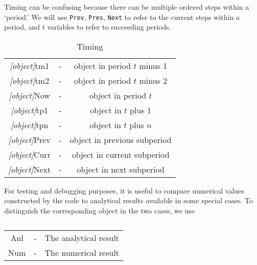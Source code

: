 Timing can be confusing because there can be multiple ordered steps
within a `period.'  We will use \texttt{Prev}, \texttt{Pres}, \texttt{Next} to refer
to the current steps within a period, and $t$ variables to refer to succeeding periods.
\begin{table}[h]
	\centering
	\begin{tabular}{||>{\ttfamily}ccc||}
		\hline
   \textit{[object]}tm1 & - & object in period $t$ minus 1
\\ \textit{[object]}tm2 & - & object in period $t$ minus 2
\\ \textit{[object]}Now & - & object in period $t$
\\ \textit{[object]}tp1 & - & object in $t$ plus 1
\\ \textit{[object]}tpn & - & object in $t$ plus $n$
\\ \textit{[object]}Prev & - & object in previous subperiod
\\ \textit{[object]}Curr & - & object in current subperiod
\\ \textit{[object]}Next & - & object in next subperiod
\\	\hline
	\end{tabular}

	\caption{Timing}
	\label{table:Timing}
\end{table}

For testing and debugging purposes, it is useful to compare numerical
values constructed by the code to analytical results available in some
special cases.  To distinguish the corresponding object in the two cases,
we use
\begin{table}[h]
	\centering
	\begin{tabular}{||>{\ttfamily}ccc||}
		\hline
Anl & - & The analytical result
\\ Num & - & The numerical result
\\ \hline
	\end{tabular}
	\caption{}
	\label{table:AnlVsNum}
\end{table}

